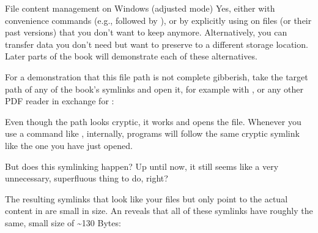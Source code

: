 \begin{windowswit}[label={ww-adjusted-mode}, before title={\thetcbcounter\ }, float, floatplacement=tbp, check odd page=true]{File content management on Windows (adjusted mode)}
\ignorespaces 
\sphinxAtStartPar
{}
Yes, either with convenience commands (e.g.,  followed by ), or by explicitly using  on files (or their past versions) that you don’t want to keep anymore.
Alternatively, you can transfer data you don’t need but want to preserve to a different storage location.
Later parts of the book will demonstrate each of these alternatives.


\end{windowswit}

\sphinxAtStartPar
For a demonstration that this file path is not complete gibberish,
take the target path of any of the book’s symlinks and
open it, for example with , or any other PDF reader in exchange for :

\begin{sphinxVerbatim}[commandchars=\\\{\}]
\end{sphinxVerbatim}

\sphinxAtStartPar
Even though the path looks cryptic, it works and opens the file. Whenever you
use a command like , internally, programs will follow
the same cryptic symlink like the one you have just opened.

\sphinxAtStartPar
But  does this symlink\sphinxhyphen{}ing happen? Up until now, it still seems like a very
unnecessary, superfluous thing to do, right?

\sphinxAtStartPar
The resulting symlinks that look like
your files but only point to the actual content in  are
small in size. An  reveals that all of these symlinks have roughly the same,
small size of \textasciitilde{}130 Bytes:

